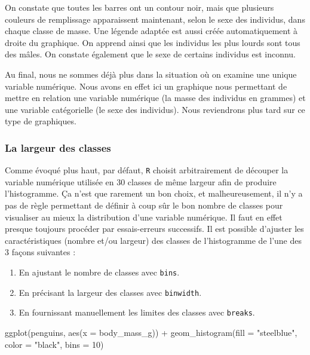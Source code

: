 \documentclass[
  a4paper,
  DIV=11,
  numbers=noendperiod,
  oneside]{scrreprt}
\newenvironment{Shaded}{}{}
\newcommand{\AttributeTok}[1]{\textcolor[rgb]{0.84,0.23,0.29}{#1}}
\newcommand{\DecValTok}[1]{\textcolor[rgb]{0.00,0.36,0.77}{#1}}
\newcommand{\FunctionTok}[1]{\textcolor[rgb]{0.44,0.26,0.76}{#1}}
\newcommand{\NormalTok}[1]{\textcolor[rgb]{0.14,0.16,0.18}{#1}}
\newcommand{\SpecialCharTok}[1]{\textcolor[rgb]{0.00,0.36,0.77}{#1}}
\newcommand{\StringTok}[1]{\textcolor[rgb]{0.01,0.18,0.38}{#1}}
\providecommand{\tightlist}{%
  \setlength{\itemsep}{0pt}\setlength{\parskip}{0pt}}\usepackage{longtable,booktabs,array}
\begin{document}
On constate que toutes les barres ont un contour noir, mais que
plusieurs couleurs de remplissage apparaissent maintenant, selon le sexe
des individus, dans chaque classe de masse. Une légende adaptée est
aussi créée automatiquement à droite du graphique. On apprend ainsi que
les individus les plus lourds sont tous des mâles. On constate également
que le sexe de certains individus est inconnu.

Au final, nous ne sommes déjà plus dans la situation où on examine une
unique variable numérique. Nous avons en effet ici un graphique nous
permettant de mettre en relation une variable numérique (la masse des
individus en grammes) et une variable catégorielle (le sexe des
individus). Nous reviendrons plus tard sur ce type de graphiques.

\subsubsection{La largeur des classes}\label{la-largeur-des-classes}

Comme évoqué plus haut, par défaut, \texttt{R} choisit arbitrairement de
découper la variable numérique utilisée en 30 classes de même largeur
afin de produire l'histogramme. Ça n'est que rarement un bon choix, et
malheureusement, il n'y a pas de règle permettant de définir à coup sûr
le bon nombre de classes pour visualiser au mieux la distribution d'une
variable numérique. Il faut en effet presque toujours procéder par
essais-erreurs successifs. Il est possible d'ajuster les
caractéristiques (nombre et/ou largeur) des classes de l'histogramme de
l'une des 3 façons suivantes :

\begin{enumerate}
\def\labelenumi{\arabic{enumi}.}
\tightlist
\item
  En ajustant le nombre de classes avec \texttt{bins}.
\item
  En précisant la largeur des classes avec \texttt{binwidth}.
\item
  En fournissant manuellement les limites des classes avec
  \texttt{breaks}.
\end{enumerate}

\begin{Shaded}
\begin{Highlighting}[]
\FunctionTok{ggplot}\NormalTok{(penguins, }\FunctionTok{aes}\NormalTok{(}\AttributeTok{x =}\NormalTok{ body\_mass\_g)) }\SpecialCharTok{+}
  \FunctionTok{geom\_histogram}\NormalTok{(}\AttributeTok{fill =} \StringTok{"steelblue"}\NormalTok{, }\AttributeTok{color =} \StringTok{"black"}\NormalTok{,}
                 \AttributeTok{bins =} \DecValTok{10}\NormalTok{)}
\end{Highlighting}
\end{Shaded}
\end{document}
